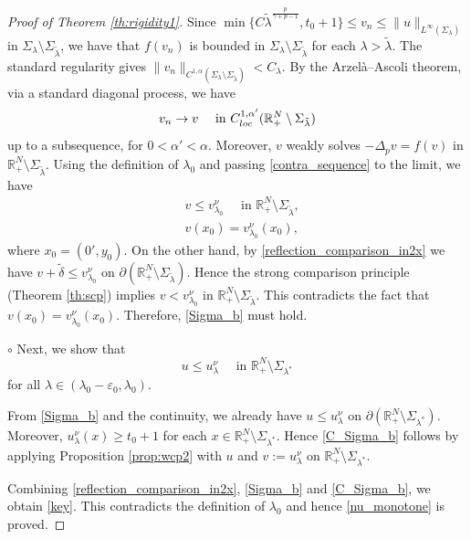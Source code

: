 \documentclass[reqno]{amsart}
\theoremstyle{plain}
\theoremstyle{definition}
\theoremstyle{remark}
\begin{document}
\begin{proof}[Proof of Theorem \ref{th:rigidity1}]
		Since $\min\{C \tilde{\lambda}^\frac{p}{\gamma+p-1}, t_0+1\} \le v_n \le \|u\|_{L^\infty(\Sigma_\lambda)}$ in $\Sigma_\lambda\setminus\Sigma_{\tilde{\lambda}}$, we have that $f(v_n)$ is bounded in $\Sigma_\lambda\setminus\Sigma_{\tilde{\lambda}}$ for each $\lambda>\tilde{\lambda}$. The standard regularity gives $\|v_n\|_{C^{1,\alpha}(\Sigma_\lambda\setminus\Sigma_{\tilde{\lambda}})} < C_\lambda$. By the Arzel\`a--Ascoli theorem, via a standard diagonal process, we have
		\[
		v_n \to v \quad\text{ in } C^{1,\alpha'}_{\rm loc}(\mathbb{R}^N_+\setminus\Sigma_{\tilde{\lambda}})
		\]
		up to a subsequence, for $0<\alpha'<\alpha$. Moreover, $v$ weakly solves $-\Delta_p v = f(v)$ in $\mathbb{R}^N_+\setminus\Sigma_{\tilde{\lambda}}$.
		Using the definition of $\lambda_0$ and passing \eqref{contra_sequence} to the limit, we have
		\begin{align*}
			&v \le v_{\lambda_0}^\nu \quad\text{ in } \mathbb{R}^N_+\setminus\Sigma_{\tilde{\lambda}},\\
			&v(x_0) = v_{\lambda_0}^\nu(x_0),
		\end{align*}
		where $x_0 = (0',y_0)$. On the other hand, by \eqref{reflection_comparison_in2x} we have $v + \tilde{\delta} \le v_{\lambda_0}^\nu$ on $\partial(\mathbb{R}^N_+\setminus\Sigma_{\tilde{\lambda}})$. Hence the strong comparison principle (Theorem \ref{th:scp}) implies $v < v_{\lambda_0}^\nu$ in $\mathbb{R}^N_+\setminus\Sigma_{\tilde{\lambda}}$. This contradicts the fact that $v(x_0) = v_{\lambda_0}^\nu(x_0)$.		
		Therefore, \eqref{Sigma_b} must hold.
		
		$\circ$ Next, we show that
		\begin{equation}\label{C_Sigma_b}
			u \le u_\lambda^\nu \quad\text{ in } \mathbb{R}^N_+\setminus\Sigma_{\lambda^*}
		\end{equation}
		for all $\lambda \in (\lambda_0-\varepsilon_0, \lambda_0)$.
		
		From \eqref{Sigma_b} and the continuity, we already have $u \le u_\lambda^\nu$ on $\partial (\mathbb{R}^N_+\setminus\Sigma_{\lambda^*})$. Moreover, $u_\lambda^\nu(x) \ge t_0+1$ for each $x\in\mathbb{R}^N_+\setminus\Sigma_{\lambda^*}$. Hence \eqref{C_Sigma_b} follows by applying Proposition \ref{prop:wcp2} with $u$ and $v:=u_\lambda^\nu$ on $\mathbb{R}^N_+\setminus\Sigma_{\lambda^*}$.
		
		Combining \eqref{reflection_comparison_in2x}, \eqref{Sigma_b} and \eqref{C_Sigma_b}, we obtain \eqref{key}. This contradicts the definition of $\lambda_0$ and hence \eqref{nu_monotone} is proved.
		

\end{proof}
\end{document}
